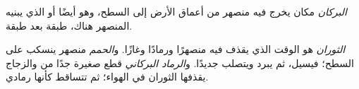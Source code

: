\begin{definition}[البركان]\label{def:g4:volcanoes-earthquakes-first-look:volcano}
\emph{البركان} مكان يخرج فيه  منصهر من أعماق الأرض إلى
السطح، وهو أيضًا  أو  الذي يبنيه  المنصهر هناك، طبقة بعد
طبقة.
\end{definition}

\begin{definition}\label{def:g4:volcanoes-earthquakes-first-look:eruption}
\emph{الثوران} هو الوقت الذي يقذف فيه   منصهرًا
ورمادًا وغازًا. و\emph{الحمم}  منصهر ينسكب على السطح؛
فيسيل، ثم يبرد ويتصلب  جديدًا.
و\emph{الرماد البركاني} قطع صغيرة جدًا من  والزجاج
يقذفها الثوران في الهواء؛ ثم تتساقط كأنها  رمادي.
\end{definition}

